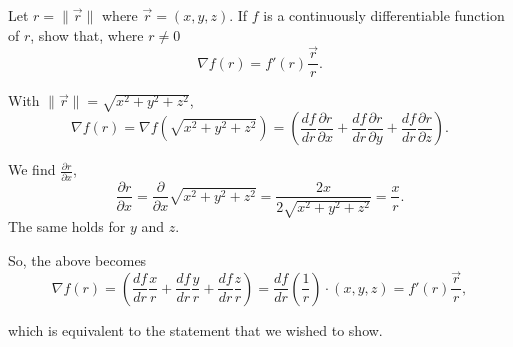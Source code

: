 \documentclass{article}
\begin{document}
  \begin{problem}
    Let $r=\|\vec{r}\|$ where $\vec{r}=(x,y,z)$. If $f$ is a continuously differentiable function of $r$, show that, where $r\neq0$ \[
    \nabla f(r)=f'(r)\frac{\vec{r}}{r}
    .\] 
  \end{problem}

  With $\|\vec{r}\|=\sqrt{x^{2}+y^{2}+z^{2}}$, \[
  \nabla f(r)=\nabla f\left(\sqrt{x^{2}+y^{2}+z^{2}}\right)=\left(\frac{df}{dr}\frac{\partial r}{\partial x}+\frac{df}{dr}\frac{\partial r}{\partial y}+\frac{df}{dr}\frac{\partial r}{\partial z}\right)
  .\] 

  We find $\frac{\partial r}{\partial x}$, \[
  \frac{\partial r}{\partial x}=\frac{\partial}{\partial x}\sqrt{x^2+y^2+z^2}=\frac{2x}{2\sqrt{x^2+y^2+z^2}}=\frac{x}{r}
  .\] 
  The same holds for $y$ and $z$.

  So, the above becomes  \[
  \nabla f(r)=\left(\frac{df}{dr}\frac{x}{r}+\frac{df}{dr}\frac{y}{r}+\frac{df}{dr}\frac{z}{r}\right)=\frac{df}{dr}\left( \frac{1}{r} \right) \cdot \left( x,y,z \right) = f'(r) \frac{\vec{r}}{r} 
  ,\] 

  which is equivalent to the statement that we wished to show.
\end{document}
